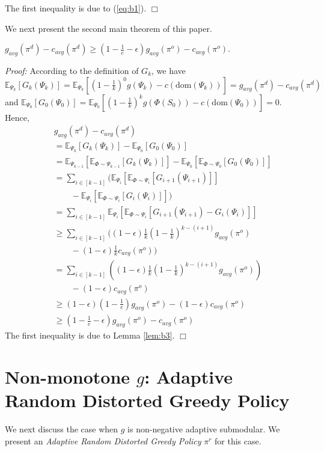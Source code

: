 \documentclass[twoside,leqno,twocolumn]{article}
\begin{document}
The first inequality is due to (\ref{eq:b1}). $\Box$

We next present the second main theorem of this paper.
\begin{theorem}
$g_{avg}(\pi^d) - c_{avg}(\pi^d) \geq (1-\frac{1}{e}-\epsilon)g_{avg}(\pi^o) - c_{avg}(\pi^o)$.
\end{theorem}
\emph{Proof:} According to the definition of $G_k$, we have $\mathbb{E}_{\Psi_k}[G_{k}(\Psi_k)] = \mathbb{E}_{\Psi_k}[(1-\frac{1}{k})^{0} g(\Psi_k)-c(\textrm{dom}(\Psi_k))]=g_{avg}(\pi^d) - c_{avg}(\pi^d)$ and $\mathbb{E}_{\Psi_0}[G_{0}(\Psi_0)] = \mathbb{E}_{\Psi_0}[(1-\frac{1}{k})^{k} g(\Phi(S_0))-c(\textrm{dom}(\Psi_0))]=0$. Hence,
\begin{eqnarray*}
&& g_{avg}(\pi^d) - c_{avg}(\pi^d) \\
&& = \mathbb{E}_{\Psi_k}[G_{k}(\Psi_k)] - \mathbb{E}_{\Psi_0}[G_{0}(\Psi_0)]\\
&& = \mathbb{E}_{\Psi_{k-1}}[\mathbb{E}_{\Phi \sim \Psi_{k-1}}[G_{k}(\Psi_k)]]- \mathbb{E}_{\Psi_0}[\mathbb{E}_{\Phi\sim \Psi_0}[G_{0}(\Psi_0)]] \\
&& = \sum_{i\in [k-1]}( \mathbb{E}_{\Psi_i}[\mathbb{E}_{\Phi\sim \Psi_i}[G_{i+1}(\Psi_{i+1})]]\\
&&\quad\quad- \mathbb{E}_{\Psi_i}[\mathbb{E}_{\Phi\sim \Psi_i}[G_{i}(\Psi_i)]]) \\
&& = \sum_{i\in [k-1]} \mathbb{E}_{\Psi_i}[\mathbb{E}_{\Phi\sim \Psi_i}[G_{i+1}(\Psi_{i+1})- G_{i}(\Psi_i)]] \\
&& \geq \sum_{i\in [k-1]} ((1-\epsilon)\frac{1}{k}(1-\frac{1}{k})^{k-(i+1)}g_{avg}(\pi^o) \\
&&\quad\quad-(1-\epsilon)\frac{1}{k}c_{avg}(\pi^o))\\
&& = \sum_{i\in [k-1]}((1-\epsilon)\frac{1}{k}(1-\frac{1}{k})^{k-(i+1)}g_{avg}(\pi^o))\\
&& \quad\quad- (1-\epsilon)c_{avg}(\pi^o)\\
&& \geq (1-\epsilon)(1-\frac{1}{e})g_{avg}(\pi^o) - (1-\epsilon)c_{avg}(\pi^o)\\
&& \geq (1-\frac{1}{e}-\epsilon)g_{avg}(\pi^o) - c_{avg}(\pi^o)
\end{eqnarray*} The first inequality is due to Lemma \ref{lem:b3}. $\Box$

\section{Non-monotone $g$:  Adaptive Random Distorted Greedy Policy}
  We next discuss the case when $g$ is non-negative adaptive submodular. We present an \emph{Adaptive Random Distorted Greedy Policy} $\pi^r$ for this case.
\end{document}
